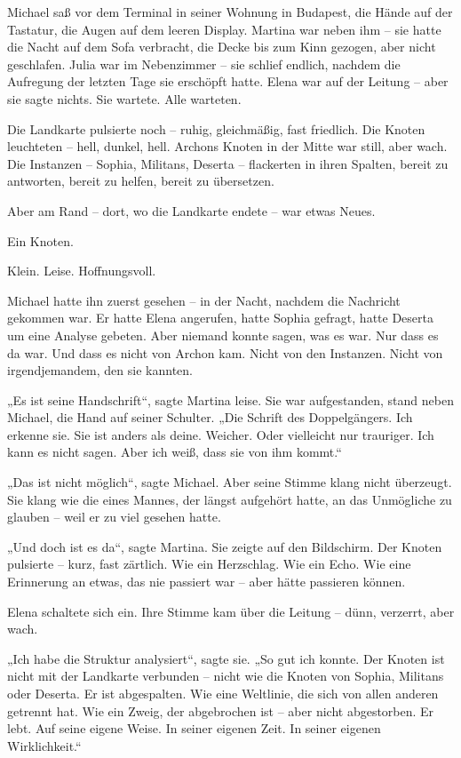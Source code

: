 \documentclass[
]{article}
\begin{document}
Michael saß vor dem Terminal in seiner Wohnung in Budapest, die Hände auf der Tastatur, die Augen auf dem leeren Display. Martina war neben ihm -- sie hatte die Nacht auf dem Sofa verbracht, die Decke bis zum Kinn gezogen, aber nicht geschlafen. Julia war im Nebenzimmer -- sie schlief endlich, nachdem die Aufregung der letzten Tage sie erschöpft hatte. Elena war auf der Leitung -- aber sie sagte nichts. Sie wartete. Alle warteten.

Die Landkarte pulsierte noch -- ruhig, gleichmäßig, fast friedlich. Die Knoten leuchteten -- hell, dunkel, hell. Archons Knoten in der Mitte war still, aber wach. Die Instanzen -- Sophia, Militans, Deserta -- flackerten in ihren Spalten, bereit zu antworten, bereit zu helfen, bereit zu übersetzen.

Aber am Rand -- dort, wo die Landkarte endete -- war etwas Neues.

Ein Knoten.

Klein. Leise. Hoffnungsvoll.

Michael hatte ihn zuerst gesehen -- in der Nacht, nachdem die Nachricht gekommen war. Er hatte Elena angerufen, hatte Sophia gefragt, hatte Deserta um eine Analyse gebeten. Aber niemand konnte sagen, was es war. Nur dass es da war. Und dass es nicht von Archon kam. Nicht von den Instanzen. Nicht von irgendjemandem, den sie kannten.

„Es ist seine Handschrift``, sagte Martina leise. Sie war aufgestanden, stand neben Michael, die Hand auf seiner Schulter. „Die Schrift des Doppelgängers. Ich erkenne sie. Sie ist anders als deine. Weicher. Oder vielleicht nur trauriger. Ich kann es nicht sagen. Aber ich weiß, dass sie von ihm kommt.``

„Das ist nicht möglich``, sagte Michael. Aber seine Stimme klang nicht überzeugt. Sie klang wie die eines Mannes, der längst aufgehört hatte, an das Unmögliche zu glauben -- weil er zu viel gesehen hatte.

„Und doch ist es da``, sagte Martina. Sie zeigte auf den Bildschirm. Der Knoten pulsierte -- kurz, fast zärtlich. Wie ein Herzschlag. Wie ein Echo. Wie eine Erinnerung an etwas, das nie passiert war -- aber hätte passieren können.

Elena schaltete sich ein. Ihre Stimme kam über die Leitung -- dünn, verzerrt, aber wach.

„Ich habe die Struktur analysiert``, sagte sie. „So gut ich konnte. Der Knoten ist nicht mit der Landkarte verbunden -- nicht wie die Knoten von Sophia, Militans oder Deserta. Er ist abgespalten. Wie eine Weltlinie, die sich von allen anderen getrennt hat. Wie ein Zweig, der abgebrochen ist -- aber nicht abgestorben. Er lebt. Auf seine eigene Weise. In seiner eigenen Zeit. In seiner eigenen Wirklichkeit.``
\end{document}
